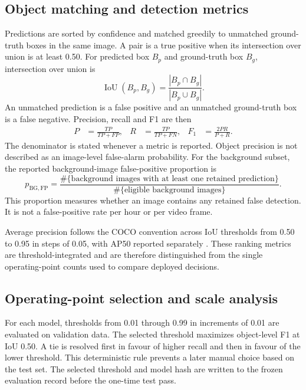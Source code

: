 \subsection{Object matching and detection metrics}

Predictions are sorted by confidence and matched greedily to unmatched
ground-truth boxes in the same image. A pair is a true positive when its
intersection over union is at least 0.50. For predicted box \(B_p\) and
ground-truth box \(B_g\), intersection over union is
\begin{equation}
  \operatorname{IoU}(B_p,B_g)=
  \frac{|B_p\cap B_g|}{|B_p\cup B_g|}.
  \label{eq:method-iou}
\end{equation}
An unmatched prediction is a false positive and an unmatched ground-truth box
is a false negative. Precision, recall and F1 are then
\begin{align}
  P &= \frac{TP}{TP+FP}, &
  R &= \frac{TP}{TP+FN}, &
  F_1 &= \frac{2PR}{P+R}.
  \label{eq:method-prf}
\end{align}
The denominator is stated whenever a metric is reported. Object precision is
not described as an image-level false-alarm probability. For the background
subset, the reported background-image false-positive proportion is
\begin{equation}
  p_{\mathrm{BG,FP}}=
  \frac{\#\{\text{background images with at least one retained prediction}\}}
       {\#\{\text{eligible background images}\}}.
  \label{eq:method-bgfp}
\end{equation}
This proportion measures whether an image contains any retained false
detection. It is not a false-positive rate per hour or per video frame.

Average precision follows the COCO convention across IoU thresholds from 0.50
to 0.95 in steps of 0.05, with AP50 reported separately
\cite{Lin2014COCO}. These ranking metrics are threshold-integrated and are
therefore distinguished from the single operating-point counts used to compare
deployed decisions.

\subsection{Operating-point selection and scale analysis}

For each model, thresholds from 0.01 through 0.99 in increments of 0.01 are
evaluated on validation data. The selected threshold maximizes object-level
F1 at IoU 0.50. A tie is resolved first in favour of higher recall and then in
favour of the lower threshold. This deterministic rule prevents a later manual
choice based on the test set. The selected threshold and model hash are written
to the frozen evaluation record before the one-time test pass.

